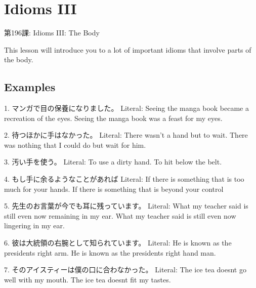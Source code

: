     
\chapter{Idioms III}

\begin{center}
\begin{Large}
第196課: Idioms III: The Body 
\end{Large}
\end{center}
 
\par{ This lesson will introduce you to a lot of important idioms that involve parts of the body. }
      
\section{Examples}
 
\par{1. マンガで目の保養になりました。 \hfill\break
Literal: Seeing the manga book became a recreation of the eyes. \hfill\break
Seeing the manga book was a feast for my eyes. }
 
\par{2. 待つほかに手はなかった。 \hfill\break
Literal: There wasn't a hand but to wait. \hfill\break
There was nothing that I could do but wait for him. }
 
\par{3. 汚い手を使う。 \hfill\break
Literal: To use a dirty hand. \hfill\break
To hit below the belt. }
 
\par{4. もし手に余るようなことがあれば \hfill\break
Literal: If there is something that is too much for your hands. \hfill\break
If there is something that is beyond your control }
 
\par{5. 先生のお言葉が今でも耳に残っています。 \hfill\break
Literal: What my teacher said is still even now remaining in my ear. \hfill\break
What my teacher said is still even now lingering in my ear. }
 
\par{6. 彼は大統領の右腕として知られています。 \hfill\break
Literal: He is known as the president\textquotesingle s right arm. \hfill\break
He is known as the president\textquotesingle s right hand man. }
 
\par{7. そのアイスティーは僕の口に合わなかった。 \hfill\break
Literal: The ice tea doesn\textquotesingle t go well with my mouth. \hfill\break
The ice tea doesn\textquotesingle t fit my tastes. }
 
